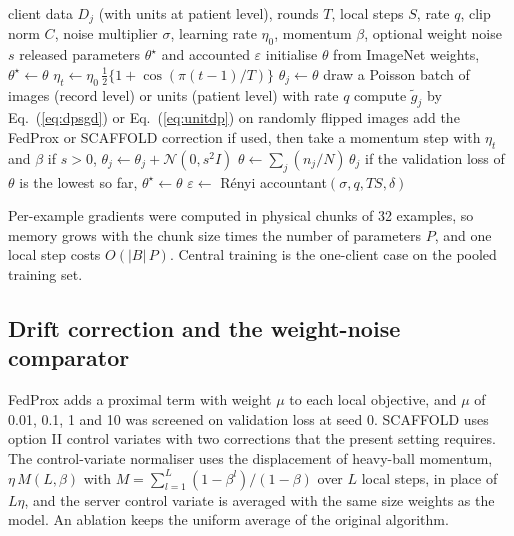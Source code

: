 \documentclass[preprint,12pt]{elsarticle}
\begin{document}
\begin{algorithm}[!t]
\caption{Federated training with client-side DP-SGD}\label{alg:train}
\small
\begin{algorithmic}[1]
\Require client data $D_j$ (with units at patient level), rounds $T$, local steps $S$, rate $q$, clip norm $C$,
noise multiplier $\sigma$, learning rate $\eta_0$, momentum $\beta$, optional weight noise $s$
\Ensure released parameters $\theta^\star$ and accounted $\varepsilon$
\State initialise $\theta$ from ImageNet weights, $\theta^\star\gets\theta$
  \State $\eta_t\gets\eta_0\,\tfrac12\{1+\cos(\pi (t-1)/T)\}$ 
    \State $\theta_j\gets\theta$
      \State draw a Poisson batch of images (record level) or units (patient level) with rate $q$
      \State compute $\tilde g_j$ by Eq.~(\ref{eq:dpsgd}) or Eq.~(\ref{eq:unitdp}) on randomly flipped images
      \State add the FedProx or SCAFFOLD correction if used, then take a momentum step with $\eta_t$ and $\beta$
    \EndFor
    \State if $s>0$, $\theta_j\gets\theta_j+\mathcal{N}(0,s^2I)$ 
  \EndFor
  \State $\theta\gets\sum_j (n_j/N)\,\theta_j$
  \State if the validation loss of $\theta$ is the lowest so far, $\theta^\star\gets\theta$
\EndFor
\State $\varepsilon\gets$ R\'enyi accountant$(\sigma,q,TS,\delta)$
\end{algorithmic}
\end{algorithm}

Per-example gradients were computed in physical chunks of 32 examples, so memory grows with the chunk size times the
number of parameters $P$, and one local step costs $O(|B|\,P)$. Central training is the one-client case on the pooled
training set.

\subsection{Drift correction and the weight-noise comparator}
FedProx\cite{li2020} adds a proximal term with weight $\mu$ to each local objective, and $\mu$ of 0.01, 0.1, 1 and 10
was screened on validation loss at seed 0. SCAFFOLD\cite{karimireddy2020} uses option II control variates with two
corrections that the present setting requires. The control-variate normaliser uses the displacement of heavy-ball
momentum, $\eta\,M(L,\beta)$ with $M=\sum_{l=1}^{L}(1-\beta^l)/(1-\beta)$ over $L$ local steps, in place of $L\eta$,
and the server control variate is averaged with the same size weights as the model. An ablation keeps the uniform
average of the original algorithm.
\end{document}
